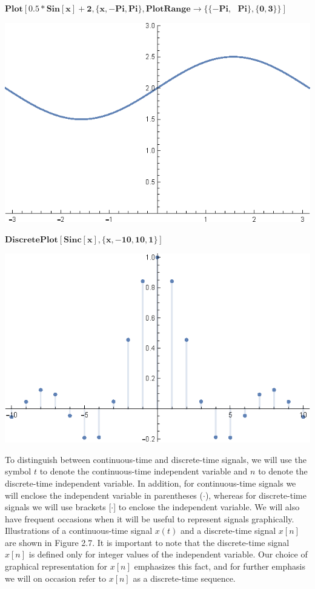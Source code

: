 \documentclass{report}
\begin{document}
\begin{doublespace}
\noindent\(\pmb{\text{Plot}[0.5*\text{Sin}[x]+2,\{x, -\text{Pi}, \text{Pi}\}, \text{PlotRange}\to \{\{-\text{Pi},\text{  }\text{Pi}\},\{0,3\}\}]}\)
\end{doublespace}

\includegraphics{GhassaneAniba_Signals_Systems_Oppenheim_Chap1_gr5.eps}

\begin{doublespace}
\noindent\(\pmb{\text{DiscretePlot}[\text{Sinc}[x],\{x, -10, 10,1\}]}\)
\end{doublespace}

\includegraphics{GhassaneAniba_Signals_Systems_Oppenheim_Chap1_gr6.eps}

To distinguish between continuous-time and discrete-time signals, we will use the symbol \(t\) to denote the continuous-time independent variable
and \(n\) to denote the discrete-time independent variable. In addition, for continuous-time signals we will enclose the independent variable in
parentheses ($\cdot $), whereas for discrete-time signals we will use brackets [$\cdot $] to enclose the independent variable. We will also have
frequent occasions when it will be useful to represent signals graphically. Illustrations of a continuous-time signal \(x(t)\) and a discrete-time
signal \(x[n]\) are shown in Figure 2.7. It is important to note that the discrete-time signal \(x[n]\) is defined only for integer values of the
independent variable. Our choice of graphical representation for \(x[n]\) emphasizes this fact, and for further emphasis we will on occasion refer
to \(x[n]\) as a discrete-time sequence.
\end{document}
